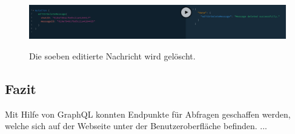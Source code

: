 \begin{figure}
	\centering
    \includegraphics[width=\textwidth]{sources/graphiql_deleteMessage.png}\cite{}
	\caption{Die soeben editierte Nachricht wird gelöscht.}
	\label{fig9}
\end{figure}

\subsection{Fazit}
Mit Hilfe von GraphQL konnten Endpunkte für Abfragen geschaffen werden, welche sich auf der Webseite unter der Benutzeroberfläche befinden. ...